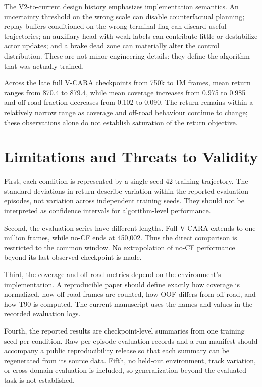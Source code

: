 \documentclass[11pt]{article}
\begin{document}
The V2-to-current design history emphasizes implementation semantics. An
uncertainty threshold on the wrong scale can disable counterfactual
planning; replay buffers conditioned on the wrong terminal flag can
discard useful trajectories; an auxiliary head with weak labels can
contribute little or destabilize actor updates; and a brake dead zone
can materially alter the control distribution. These are not minor
engineering details: they define the algorithm that was actually
trained.

Across the late full V-CARA checkpoints from 750k to 1M frames, mean
return ranges from 870.4 to 879.4, while mean coverage increases from 0.975
to 0.985 and off-road fraction decreases from 0.102 to 0.090. The return
remains within a relatively narrow range as coverage and off-road behaviour
continue to change; these observations alone do not establish saturation
of the return objective.

\section{Limitations and Threats to
Validity}\label{limitations-and-threats-to-validity}

First, each condition is represented by a single seed-42 training
trajectory. The standard deviations in return describe variation within
the reported evaluation episodes, not variation across independent
training seeds. They should not be interpreted as confidence intervals
for algorithm-level performance.

Second, the evaluation series have different lengths. Full V-CARA
extends to one million frames, while no-CF ends at 450,002. Thus the
direct comparison is restricted to the common window. No extrapolation
of no-CF performance beyond its last observed checkpoint is made.

Third, the coverage and off-road metrics depend on the environment's
implementation. A reproducible paper should define exactly how coverage
is normalized, how off-road frames are counted, how OOF differs from
off-road, and how T90 is computed. The current manuscript uses the names
and values in the recorded evaluation logs.

Fourth, the reported results are checkpoint-level summaries from one training seed per condition. Raw per-episode evaluation records and a run manifest should accompany a public reproducibility release so that each summary can be regenerated from its source data. Fifth, no held-out environment, track variation, or cross-domain evaluation is included, so generalization beyond the evaluated task is not established.
\end{document}
